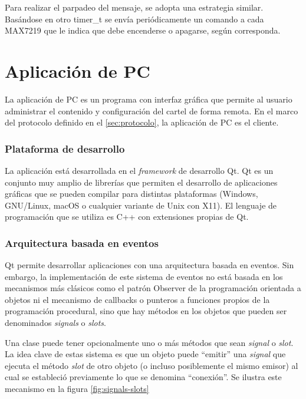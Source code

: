 Para realizar el parpadeo del mensaje, se adopta una estrategia similar.
Basándose en otro timer\_t se envía periódicamente un comando a cada MAX7219 que le indica que debe encenderse o apagarse, según corresponda.

\section{Aplicación de PC}\label{sec:pc}
La aplicación de PC es un programa con interfaz gráfica que permite al usuario administrar el contenido y configuración del cartel de forma remota. En el marco del protocolo definido en el \ref{sec:protocolo}, la aplicación de PC es el cliente.

\subsubsection{Plataforma de desarrollo}
La aplicación está desarrollada en el \emph{framework} de desarrollo Qt. Qt es un conjunto muy amplio de librerías que permiten el desarrollo de aplicaciones gráficas que se pueden compilar para distintas plataformas (Windows, GNU/Linux, macOS o cualquier variante de Unix con X11). El lenguaje de programación que se utiliza es C++ con extensiones propias de Qt.

\subsubsection{Arquitectura basada en eventos}\label{sec:qt}
Qt permite desarrollar aplicaciones con una arquitectura basada en eventos. Sin embargo, la implementación de este sistema de eventos no está basada en los mecanismos más clásicos como el patrón Observer de la programación orientada a objetos ni el mecanismo de callbacks o punteros a funciones propios de la programación procedural, sino que hay métodos en los objetos que pueden ser denominados \emph{signals} o \emph{slots}.

Una clase puede tener opcionalmente uno o más métodos que sean \emph{signal} o \emph{slot}. La idea clave de estas sistema es que un objeto puede \enquote{emitir} una \emph{signal} que ejecuta el método \emph{slot} de otro objeto (o incluso posiblemente el mismo emisor) al cual se estableció previamente lo que se denomina \enquote{conexión}. Se ilustra este mecanismo en la figura \ref{fig:signals-slots}

